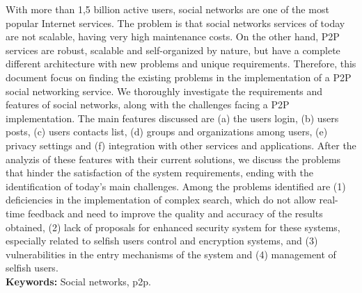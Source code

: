 With more than 1,5 billion active users, social networks are one of the most
popular Internet services.
The  problem is that social networks services of today are not scalable, 
having very high maintenance costs.
On the other hand, P2P services are robust, scalable and self-organized by nature, but have a
complete different architecture with new problems and unique requirements. 
 Therefore, this document focus on finding the existing problems in the
implementation of a P2P social networking service.
 We thoroughly investigate the requirements and features of social networks, along with the
challenges facing a P2P implementation. The main features discussed are (a)
the users login, (b) users posts, (c) users contacts list, (d) groups and organizations
among users, (e) privacy settings and (f) integration with other services and
applications.
After the analyzis of these features with their current solutions,
we discuss the problems that hinder the satisfaction of the system requirements, ending with the identification of today's main challenges.
Among the problems identified are (1) deficiencies in the
implementation of complex search, which do not allow real-time
feedback and need to improve the quality and accuracy of the results obtained,
(2) lack of proposals for enhanced security system for these systems,
especially related to selfish users control and encryption systems,
and (3) vulnerabilities in the entry mechanisms of the system and (4) management of
selfish users.\\


\textbf{Keywords:}  Social networks, p2p.
